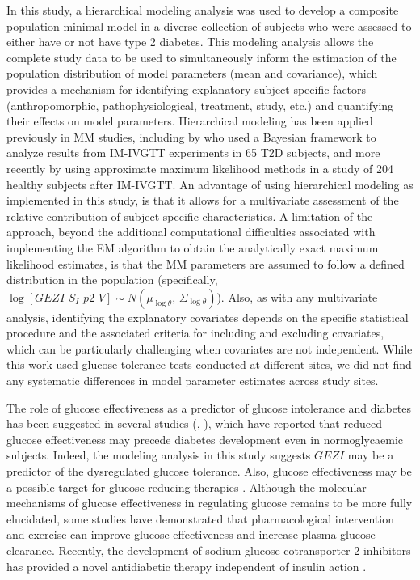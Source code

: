 \documentclass[utf8]{frontiersSCNS} %
\begin{document}
In this study, a hierarchical modeling analysis was used to develop a composite population minimal model in a diverse collection of subjects who were assessed to either have or not have type 2 diabetes. This modeling analysis allows the complete study data to be used to simultaneously inform the estimation of the population distribution of model parameters (mean and covariance), which provides a mechanism for identifying explanatory subject specific factors (anthropomorphic, pathophysiological, treatment, study, etc.) and quantifying their effects on model parameters. Hierarchical modeling has been applied previously in MM studies, including by \citet{agbaje_2003} who used a Bayesian framework to analyze results from IM-IVGTT experiments in 65 T2D subjects, and more recently by \citet{Denti2010} using approximate maximum likelihood methods in a study of 204 healthy subjects after IM-IVGTT. An advantage of using hierarchical modeling as implemented in this study, is that it allows for a multivariate assessment of the relative contribution of subject specific characteristics. A limitation of the approach, beyond the additional computational difficulties associated with implementing the EM algorithm to obtain the analytically exact maximum likelihood estimates, is that the MM parameters are assumed to follow a defined distribution in the population (specifically, $\log \left[ GEZI\,\,{S_I}\,\,p2\,\,V \right] \sim N\left( {\mu_{\log \theta }},\,{\Sigma_{\log \theta}} \right)$). Also, as with any multivariate analysis, identifying the explanatory covariates depends on the specific statistical procedure and the associated criteria for including and excluding covariates, which can be particularly challenging when covariates are not independent. While this work used glucose tolerance tests conducted at different sites, we did not find any systematic differences in model parameter estimates across study sites.

The role of glucose effectiveness as a predictor of glucose intolerance and diabetes has been suggested in several studies (\citet{Martin1992}, \citet{lorenzo_2010}), which have reported that reduced glucose effectiveness may precede diabetes development even in normoglycaemic subjects. Indeed, the modeling analysis in this study suggests $GEZI$ may be a predictor of the dysregulated glucose tolerance. Also, glucose effectiveness may be a possible target for glucose-reducing therapies \citep{Ahren_2020}. Although the molecular mechanisms of glucose effectiveness in regulating glucose remains to be more fully elucidated, some studies have demonstrated that pharmacological intervention \citep{pau_2014} and exercise \citep{kar_2017} can improve glucose effectiveness and increase plasma glucose clearance. Recently, the development of sodium glucose cotransporter 2 inhibitors has provided a novel antidiabetic therapy independent of insulin action \citep{SGLT2_2015}. 
\end{document}
